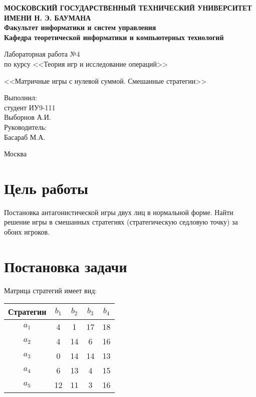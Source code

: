 \documentclass[12pt,a4paper,oneside]{extarticle}
\begin{document}
\pgfplotsset{compat=1.8}

\thispagestyle{empty}
\newpage
{
\centering


\textbf{
МОСКОВСКИЙ ГОСУДАРСТВЕННЫЙ ТЕХНИЧЕСКИЙ УНИВЕРСИТЕТ ИМЕНИ Н. Э. БАУМАНА \\
Факультет информатики и систем управления \\
Кафедра теоретической информатики и компьютерных технологий}
\bigskip
\bigskip
\bigskip
\bigskip
\bigskip
\bigskip
\bigskip

\vfill


Лабораторная работа №4 \\
по курсу <<Теория игр и исследование операций>>

\bigskip

{\large <<Матричные игры с нулевой суммой. Смешанные стратегии>>}
\bigskip

\vfill



\hfill\parbox{4cm} {
Выполнил:\\
студент ИУ9-111 \hfill \\
Выборнов А.И.\hfill \medskip\\
Руководитель:\\
Басараб М.А.\hfill
}


\vspace{\fill}

Москва \number\year
\clearpage
}



\clearpage

\section{Цель работы}
    Постановка антагонистической игры двух лиц в нормальной форме. Найти решение игры в смешанных стратегиях (стратегическую седловую точку) за обоих игроков.

\section{Постановка задачи}
    Матрица стратегий имеет вид:

    \begin{center}
        \begin{tabular}{|c|c|c|c|c|}
            \hline
            Стратегии & $b_1$ & $b_2$ & $b_3$ & $b_4$ \\ \hline
            $a_1$     & 4     & 1     & 17    & 18    \\ \hline
            $a_2$     & 4     & 14    & 6     & 16    \\ \hline
            $a_3$     & 0     & 14    & 14    & 13    \\ \hline
            $a_4$     & 6     & 13    & 4     & 15    \\ \hline
            $a_5$     & 12    & 11    & 3     & 16    \\ \hline
        \end{tabular}
    \end{center}
\end{document}
